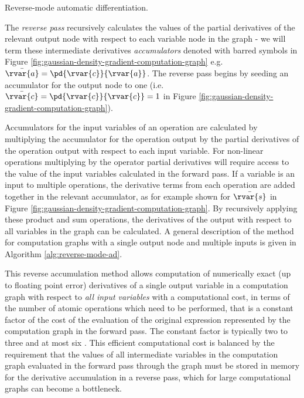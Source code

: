 \begin{algorithm}[!t]
\caption{Reverse-mode automatic differentiation.}
\label{alg:reverse-mode-ad}

\end{algorithm}

The \emph{reverse pass} recursively calculates the values of the partial derivatives of the relevant output node with respect to each variable node in the graph - we will term these intermediate derivatives \emph{accumulators} denoted with barred symbols in Figure \ref{fig:gaussian-density-gradient-computation-graph} e.g. $\bar{\rvar{a}} = \pd{\rvar{c}}{\rvar{a}}$. The reverse pass begins by seeding an accumulator for the output node to one (i.e. $\bar{\rvar{c}} = \pd{\rvar{c}}{\rvar{c}} = 1$ in Figure \ref{fig:gaussian-density-gradient-computation-graph}). 

Accumulators for the input variables of an operation are calculated by multiplying the accumulator for the operation output by the partial derivatives of the operation output with respect to each input variable. For non-linear operations multiplying by the operator partial derivatives will require access to the value of the input variables calculated in the forward pass. If a variable is an input to multiple operations, the derivative terms from each operation are added together in the relevant accumulator, as for example shown for $\bar{\rvar{s}}$ in Figure \ref{fig:gaussian-density-gradient-computation-graph}. By recursively applying these product and sum operations, the derivatives of the output with respect to all variables in the graph can be calculated. A general description of the method for computation graphs with a single output node and multiple inputs is given in Algorithm \ref{alg:reverse-mode-ad}.

This reverse accumulation method allows computation of numerically exact (up to floating point error) derivatives of a single output variable in a computation graph with respect to \emph{all input variables} with a computational cost, in terms of the number of atomic operations which need to be performed, that is a constant factor of the cost of the evaluation of the original expression represented by the computation graph in the forward pass. The constant factor is typically two to three and at most six \citep{baydin2015automatic}. This efficient computational cost is balanced by the requirement that the values of all intermediate variables in the computation graph evaluated in the forward pass through the graph must be stored in memory for the derivative accumulation in a reverse pass, which for large computational graphs can become a bottleneck.

